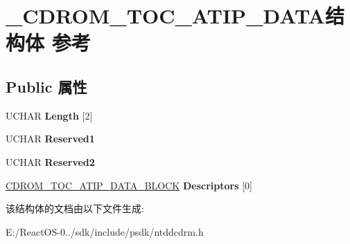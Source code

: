 \hypertarget{struct___c_d_r_o_m___t_o_c___a_t_i_p___d_a_t_a}{}\section{\+\_\+\+C\+D\+R\+O\+M\+\_\+\+T\+O\+C\+\_\+\+A\+T\+I\+P\+\_\+\+D\+A\+T\+A结构体 参考}
\label{struct___c_d_r_o_m___t_o_c___a_t_i_p___d_a_t_a}
\subsection*{Public 属性}
\begin{DoxyCompactItemize}
\item 
\mbox{\label{struct___c_d_r_o_m___t_o_c___a_t_i_p___d_a_t_a_adcc1680e857e55b74e36cb972a2a7938}} 
U\+C\+H\+AR {\bfseries Length} \mbox{[}2\mbox{]}
\item 
\mbox{\label{struct___c_d_r_o_m___t_o_c___a_t_i_p___d_a_t_a_ad3c3f190174c4ea4a24db5afed916e96}} 
U\+C\+H\+AR {\bfseries Reserved1}
\item 
\mbox{\label{struct___c_d_r_o_m___t_o_c___a_t_i_p___d_a_t_a_a09d637603feeca25aedfad1b2505883d}} 
U\+C\+H\+AR {\bfseries Reserved2}
\item 
\mbox{\label{struct___c_d_r_o_m___t_o_c___a_t_i_p___d_a_t_a_a5af8bd4b5450abbefba65661d7606767}} 
\hyperlink{struct___c_d_r_o_m___t_o_c___a_t_i_p___d_a_t_a___b_l_o_c_k}{C\+D\+R\+O\+M\+\_\+\+T\+O\+C\+\_\+\+A\+T\+I\+P\+\_\+\+D\+A\+T\+A\+\_\+\+B\+L\+O\+CK} {\bfseries Descriptors} \mbox{[}0\mbox{]}
\end{DoxyCompactItemize}


该结构体的文档由以下文件生成\+:\begin{DoxyCompactItemize}
\item 
E\+:/\+React\+O\+S-\/0../sdk/include/psdk/ntddcdrm.\+h\end{DoxyCompactItemize}
